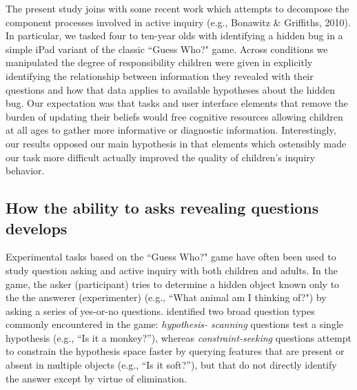 \documentclass[10pt,letterpaper]{article}
\begin{document}
\nocite{Bonawitz:2010pb}
The present study joins with some recent work which attempts to decompose the 
component processes involved in active inquiry (e.g., Bonawitz \& Griffiths, 2010).  
In particular, we tasked four to ten-year olds with identifying a hidden bug in
a simple iPad variant of the classic ``Guess Who?" game.
Across conditions we manipulated the degree of responsibility children were given in explicitly 
identifying the relationship between information they revealed with their questions and 
how that data applies to available hypotheses about the hidden bug.  Our 
expectation was that tasks and user interface elements that  remove the burden of 
updating their beliefs would free cognitive resources allowing children at all ages to  
gather more informative or diagnostic information. 
Interestingly, our results opposed our main hypothesis in that elements which 
ostensibly made our task more difficult actually improved the quality of children's inquiry 
behavior.  

\subsection{How the ability to asks revealing questions develops}

Experimental tasks based on the ``Guess Who?" game have often been used to
study question asking and active inquiry with both children and adults.
In the game, the asker (participant) tries to determine a hidden object known
only to the the answerer (experimenter) (e.g., ``What animal am I thinking of?")
by asking a series of yes-or-no questions.
 identified two broad question types commonly encountered in the game: \emph{hypothesis-
scanning} questions test a single hypothesis (e.g., ``Is it a monkey?''), whereas 
\emph{constraint-seeking} questions attempt to constrain the hypothesis space faster by 
querying features that are present or absent in multiple objects (e.g., ``Is it soft?''), 
but that do not directly identify the answer except by virtue of elimination. 
\end{document}
